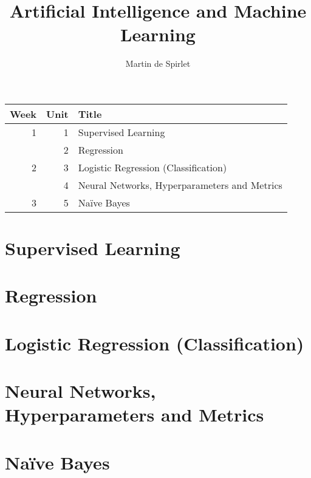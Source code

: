 \documentclass[
  11pt,
  a4paper,
]{article}
\title{Artificial Intelligence and Machine Learning}
\author{Martin de Spirlet}
\date{}
\begin{document}

\maketitle

\vspace*{\fill}

\begin{table}[htp]
  \centering
  \begin{tabular}{rrl}
    \toprule
    Week & Unit & Title \\
    \midrule
    1 & 1 & Supervised Learning \\
      & 2 & Regression \\ [1ex]
    2 & 3 & Logistic Regression (Classification) \\
      & 4 & Neural Networks, Hyperparameters and Metrics \\ [1ex]
    3 & 5 & Na\"{i}ve Bayes \\
    \bottomrule
  \end{tabular}
\end{table}

\vspace*{\fill}
\addvspace{1in}

\clearpage


\section{Supervised Learning}


\section{Regression}


\section{Logistic Regression (Classification)}


\section{Neural Networks, Hyperparameters and Metrics}


\section{Na\"{i}ve Bayes}

\end{document}
